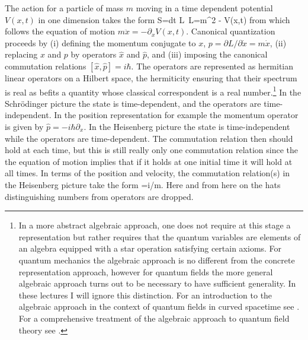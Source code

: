 \documentclass[12pt]{article}
\begin{document}
The action for a particle of mass $m$ moving in a time dependent
potential $V(x,t)$ in one dimension takes the form
%
\beq S=\int dt\; L\qquad\qquad\ L=m^2 - V(x,t)
\eeq
%
from which follows the equation of motion $m\ddot{x}=-\partial_x
V(x,t)$. Canonical quantization proceeds by (i) defining the
momentum conjugate to $x$, $p=\partial L/\partial
\dot{x}=m\dot{x}$, (ii) replacing $x$ and $p$ by operators
$\hat{x}$ and $\hat{p}$, and (iii) imposing the canonical
commutation relations $[\hat{x},\hat{p}]=i\hbar$. The operators
are represented as hermitian linear operators on a Hilbert space,
the hermiticity ensuring that their spectrum is real as befits a
quantity whose classical correspondent is a real number.\footnote{In 
a more abstract algebraic approach, one does not
require at this stage a representation but rather requires that
the quantum variables are elements of an algebra equipped
with a star operation satisfying certain axioms. For quantum
mechanics the algebraic approach is no different from the
concrete representation approach, however for quantum fields
the more general algebraic approach turns out to be necessary
to have sufficient generality. In these lectures I will ignore
this distinction. For an introduction to the algebraic approach
in the context of quantum fields in curved spacetime see
\cite{Wald94}. For a comprehensive treatment of the
algebraic approach to quantum field theory see
\cite{Haag}.\label{algebra}}
%
In the Schr\"odinger picture the state is time-dependent, and the
operators are time-independent. In the position representation
for example the momentum operator is given by
$\hat{p}=-i\hbar\partial_x$. In the Heisenberg picture the state
is time-independent while the operators are time-dependent. The
commutation relation then should hold at each time, but this is
still really only one commutation relation since the the equation
of motion implies that if it holds at one initial time it will
hold at all times. In terms of the position and velocity, the
commutation relation(s) in the Heisenberg picture take the form
%
\beq [x(t),\dot{x}(t)]=i\hbar/m. \label{cr}\eeq
%
Here and from here on the hats distinguishing numbers from
operators are dropped.
\end{document}
